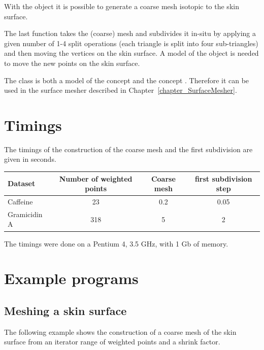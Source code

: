 With the  object it is possible to generate a
coarse mesh isotopic to the skin surface. 


The last function takes the (coarse) mesh and subdivides it in-situ by
applying a given number of 1-4 split operations (each triangle is
split into four sub-triangles) and then moving the vertices on the
skin surface. A model of the  object is needed to
move the new points on the skin surface.

%
The class  is both a model of the concept
 and the concept .
Therefore it can be used in the surface mesher described in
Chapter~\ref{chapter_SurfaceMesher}.

\section{Timings}
The timings of the construction of the coarse mesh and the first
subdivision are given in seconds.
\begin{center}
  \begin{tabular}{|l|c|c|c|}
    \hline
    Dataset & Number of weighted points & Coarse mesh & first subdivision step\\
    \hline
    \hline
    Caffeine& 23 & 0.2 & 0.05 \\
    Gramicidin A& 318 & 5 & 2\\
    \hline
  \end{tabular}
\end{center}
The timings were done on a Pentium 4, 3.5 GHz, with 1 Gb of memory.
\section{Example programs}
\subsection{Meshing a skin surface}
The following example shows the construction of a coarse mesh of the
skin surface from an iterator range of weighted points and a shrink factor.


